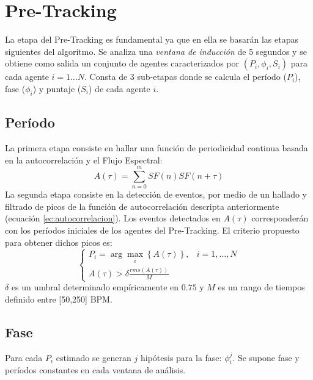 \documentclass[12pt,a4paper,titlepage]{report}
\begin{document}

\section{Pre-Tracking}
\label{sec:pretracking}

La etapa del Pre-Tracking es fundamental ya que en ella se basarán las etapas siguientes del algoritmo. Se analiza una \emph{ventana de inducción} de 5 segundos y se obtiene como salida un conjunto de agentes caracterizados por $(P_i,\phi _i, S_i) $ para cada agente $i=1\dots N$. Consta de 3 sub-etapas donde se calcula el período ($P_i$), fase ($\phi _i$) y puntaje ($S_i$) de cada agente $i$.

\subsection{Período}
La primera etapa consiste en hallar una función de periodicidad continua basada en la autocorrelación y el Flujo Espectral:
\begin{equation}
	A(\tau) = \sum\limits_{n=0}^{m}SF(n)SF(n+\tau)
	\label{ec:autocorrelacion}
\end{equation}
La segunda etapa consiste en la detección de eventos, por medio de un hallado y filtrado de picos de la función de autocorrelación descripta anteriormente (ecuación \ref{ec:autocorrelacion}). Los eventos detectados en $A(\tau)$ corresponderán con los períodos iniciales de los agentes del Pre-Tracking. El criterio propuesto para obtener dichos picos es:
\begin{equation*}
	\begin{cases}
	P_i = \arg\max_i \left\{ A(\tau) \right\}, & i=1,\dots, N\\
	A(\tau)>\delta \frac{rms(A(\tau))}{M} & 
	\end{cases}
	\label{ec:period}
\end{equation*}
$\delta$ es un umbral determinado empíricamente en $0.75$ y $M$ es un rango de tiempos definido entre [50,250] BPM.


\subsection{Fase}

Para cada $P_i$ estimado se generan $j$ hipótesis para la fase: $\phi_i^j$. Se supone fase y períodos constantes en cada ventana de análisis.\\
\end{document}
